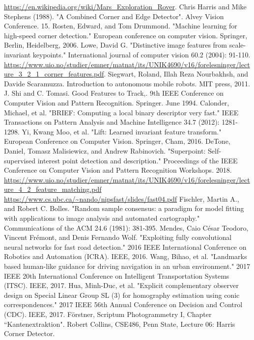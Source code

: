 \documentclass[aspectratio=169, compress]{beamer}
\begin{document}
	\begin{thebibliography}{00}
	 \url{https://en.wikipedia.org/wiki/Mars_Exploration_Rover}.
	  Chris Harris and Mike Stephens (1988). "A Combined Corner and Edge Detector". Alvey Vision Conference. 15.
	 Rosten, Edward, and Tom Drummond. "Machine learning for high-speed corner detection." European conference on computer vision. Springer, Berlin, Heidelberg, 2006.
	 Lowe, David G. "Distinctive image features from scale-invariant keypoints." International journal of computer vision 60.2 (2004): 91-110.
	 \url{https://www.uio.no/studier/emner/matnat/its/UNIK4690/v16/forelesninger/lecture_3_2_1_corner_features.pdf}.
	 Siegwart, Roland, Illah Reza Nourbakhsh, and Davide Scaramuzza. Introduction to autonomous mobile robots. MIT press, 2011.
	 J. Shi and C. Tomasi. Good Features to Track,. 9th IEEE Conference on Computer Vision and Pattern Recognition. Springer. June 1994. 
	 Calonder, Michael, et al. "BRIEF: Computing a local binary descriptor very fast." IEEE Transactions on Pattern Analysis and Machine Intelligence 34.7 (2012): 1281-1298.
	 Yi, Kwang Moo, et al. "Lift: Learned invariant feature transform." European Conference on Computer Vision. Springer, Cham, 2016.
	 DeTone, Daniel, Tomasz Malisiewicz, and Andrew Rabinovich. "Superpoint: Self-supervised interest point detection and description." Proceedings of the IEEE Conference on Computer Vision and Pattern Recognition Workshops. 2018.
	 \url{ https://www.uio.no/studier/emner/matnat/its/UNIK4690/v16/forelesninger/lecture_4_2_feature_matching.pdf}
	 \url{https://www.cs.ubc.ca/~nando/nipsfast/slides/fast04.pdf}
	 Fischler, Martin A., and Robert C. Bolles. "Random sample consensus: a paradigm for model fitting with applications to image analysis and automated cartography." Communications of the ACM 24.6 (1981): 381-395.
	 Mendes, Caio César Teodoro, Vincent Frémont, and Denis Fernando Wolf. "Exploiting fully convolutional neural networks for fast road detection." 2016 IEEE International Conference on Robotics and Automation (ICRA). IEEE, 2016.
	 Wang, Bihao, et al. "Landmarks based human-like guidance for driving navigation in an urban environment." 2017 IEEE 20th International Conference on Intelligent Transportation Systems (ITSC). IEEE, 2017.
	 Hua, Minh-Duc, et al. "Explicit complementary observer design on Special Linear Group SL (3) for homography estimation using conic correspondences." 2017 IEEE 56th Annual Conference on Decision and Control (CDC). IEEE, 2017.
	 F\"orstner, Scriptum Photogrammetry I, Chapter “Kantenextraktion".
	 Robert Collins, CSE486, Penn State, Lecture 06: Harris Corner Detector.

	\end{thebibliography}	
	
\end{document}
